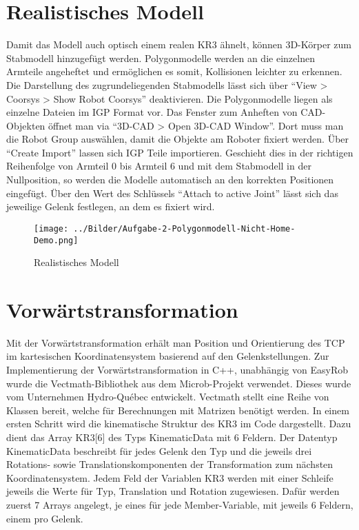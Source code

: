 \documentclass[11pt, a4paper]{article}
\begin{document}
\section{Realistisches Modell}
Damit das Modell auch optisch einem realen KR3 ähnelt, können 3D-Körper zum Stabmodell hinzugefügt werden. Polygonmodelle werden an die einzelnen Armteile angeheftet und ermöglichen es somit, Kollisionen leichter zu erkennen. Die Darstellung des zugrundeliegenden Stabmodells lässt sich über \enquote{View > Coorsys > Show Robot Coorsys} deaktivieren. Die Polygonmodelle liegen als einzelne Dateien im IGP Format vor. Das Fenster zum Anheften von CAD-Objekten öffnet man via \enquote{3D-CAD > Open 3D-CAD Window}. Dort muss man die Robot Group auswählen, damit die Objekte am Roboter fixiert werden. Über \enquote{Create Import} lassen sich IGP Teile importieren. Geschieht dies in der richtigen Reihenfolge von Armteil 0 bis Armteil 6 und mit dem Stabmodell in der Nullposition, so werden die Modelle automatisch an den korrekten Positionen eingefügt. Über den Wert des Schlüssels \enquote{Attach to active Joint} lässt sich das jeweilige Gelenk festlegen, an dem es fixiert wird.
\begin{figure}[H]
\texttt{[image: ../Bilder/Aufgabe-2-Polygonmodell-Nicht-Home-Demo.png]}
\caption{Realistisches Modell}
\end{figure}
\section{Vorwärtstransformation}
Mit der Vorwärtstransformation erhält man Position und Orientierung des TCP im kartesischen Koordinatensystem basierend auf den Gelenkstellungen. Zur Implementierung der Vorwärtstransformation in C++, unabhängig von EasyRob wurde die Vectmath-Bibliothek aus dem Microb-Projekt verwendet. Dieses wurde vom Unternehmen Hydro-Québec entwickelt. Vectmath stellt eine Reihe von Klassen bereit, welche für Berechnungen mit Matrizen benötigt werden. In einem ersten Schritt wird die kinematische Struktur des KR3 im Code dargestellt. Dazu dient das Array KR3[6] des Typs KinematicData mit 6 Feldern. Der Datentyp KinematicData beschreibt für jedes Gelenk den Typ und die jeweils drei Rotations- sowie Translationskomponenten der Transformation zum nächsten Koordinatensystem. Jedem Feld der Variablen KR3 werden mit einer Schleife jeweils die Werte für Typ, Translation und Rotation zugewiesen. Dafür werden zuerst 7 Arrays angelegt, je eines für jede Member-Variable, mit jeweils 6 Feldern, einem pro Gelenk.
\end{document}
